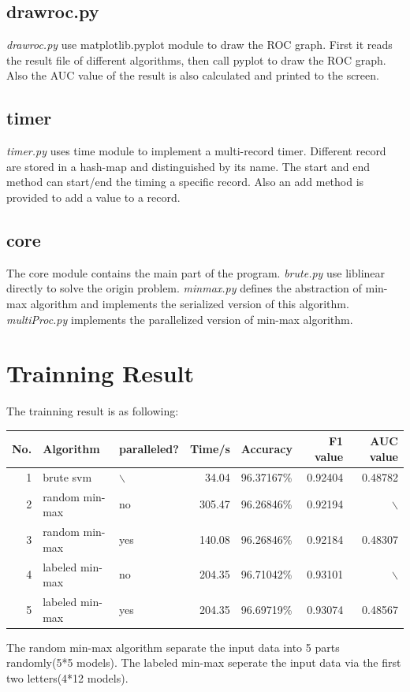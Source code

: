\documentclass[11pt]{article}
\begin{document}
\subsection{drawroc.py}
\label{sec-3-5}
\emph{drawroc.py} use matplotlib.pyplot module to draw the ROC graph.
First it reads the result file of different algorithms, then call pyplot
to draw the ROC graph. Also the AUC value of the result is also calculated
and printed to the screen.
\subsection{timer}
\label{sec-3-6}
\emph{timer.py} uses time module to implement a multi-record timer. Different record
are stored in a hash-map and distinguished by its name. The start and end method
can start/end the timing a specific record. Also an add method is provided to
add a value to a record.
\subsection{core}
\label{sec-3-7}
The core module contains the main part of the program.
\emph{brute.py} use liblinear directly to solve the origin problem.
\emph{minmax.py} defines the abstraction of min-max algorithm and implements
the serialized version of this algorithm.
\emph{multiProc.py} implements the parallelized version of min-max algorithm.

\section{Trainning Result}
\label{sec-4}
The trainning result is as following:
\begin{center}
\begin{tabular}{rllrlrr}
\hline
No. & Algorithm & paralleled? & Time/s & Accuracy & F1 value & AUC value\\
\hline
1 & brute svm & $\backslash$ & 34.04 & 96.37167\% & 0.92404 & 0.48782\\
2 & random min-max & no & 305.47 & 96.26846\% & 0.92194 & $\backslash$\\
3 & random min-max & yes & 140.08 & 96.26846\% & 0.92184 & 0.48307\\
4 & labeled min-max & no & 204.35 & 96.71042\% & 0.93101 & $\backslash$\\
5 & labeled min-max & yes & 204.35 & 96.69719\% & 0.93074 & 0.48567\\
\hline
\end{tabular}
\end{center}
The random min-max algorithm separate the input data into 5 parts randomly(5*5 models).
The labeled min-max seperate the input data via the first two letters(4*12 models).
\end{document}
